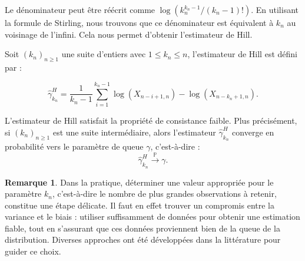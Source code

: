 \documentclass{article}
\theoremstyle{plain}
\theoremstyle{definition}
\newtheorem{remark}[definition]{Remarque}
\theoremstyle{plain}
\begin{document}
Le dénominateur peut être réécrit comme \(\log(k_n^{k_n - 1}/(k_n - 1)!)\). En utilisant la formule de Stirling, nous trouvons que ce dénominateur est équivalent à \(k_n\) au voisinage de l'infini. Cela nous permet d'obtenir l'estimateur de Hill.

Soit $(k_n)_{n \geq 1}$ une suite d'entiers avec $1 \leq k_n \leq n$, l’estimateur de Hill est défini par :

\[
\hat{\gamma}^{H}_{k_n} = \frac{1}{k_n - 1} \sum_{i=1}^{k_n - 1} \log(X_{n - i + 1, n}) - \log(X_{n - k_n + 1, n}).
\]

L’estimateur de Hill satisfait la propriété de consistance faible. Plus précisément, si $(k_n)_{n \geq 1}$ est une suite intermédiaire, alors l’estimateur $\hat{\gamma}^{H}_{k_n}$ converge en probabilité vers le paramètre de queue $\gamma$, c’est-à-dire :
\[
\hat{\gamma}^{H}_{k_n} \xrightarrow{\mathbb{P}} \gamma.
\]

\begin{remark}
	Dans la pratique, déterminer une valeur appropriée pour le paramètre $k_n$, c’est-à-dire le nombre de plus grandes observations à retenir, constitue une étape délicate. Il faut en effet trouver un compromis entre la variance et le biais : utiliser suffisamment de données pour obtenir une estimation fiable, tout en s’assurant que ces données proviennent bien de la queue de la distribution. Diverses approches ont été développées dans la littérature pour guider ce choix.
\end{remark}
\end{document}
